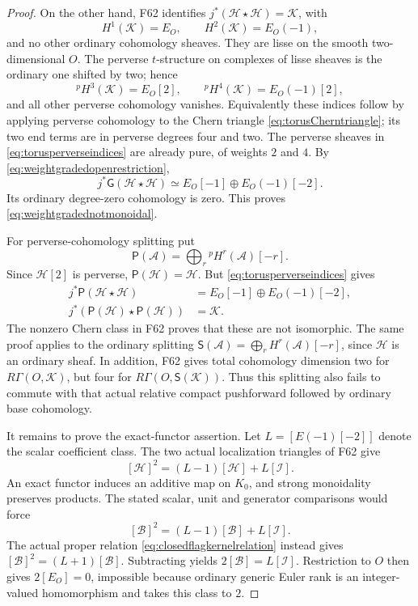 \documentclass[11pt,a4paper]{article}
\newcommand{\fid}[1]{\textsf{#1}}\newcommand{\gate}[1]{\textsf{#1}}
\theoremstyle{named}\newtheorem{finding}{Finding}[section]
\theoremstyle{definition}\newtheorem{definition}[finding]{Definition}
\theoremstyle{remark}\newtheorem{remark}[finding]{Remark}
\begin{document}
\begin{proof}
On the other hand, \fid{F62} identifies
\(j^*(\mathcal H\star\mathcal H)=\mathcal K\), with
\[
 H^1(\mathcal K)=E_O,\qquad
 H^2(\mathcal K)=E_O(-1),
\]
and no other ordinary cohomology sheaves. They are lisse on
the smooth two-dimensional \(O\). The perverse \(t\)-structure
on complexes of lisse sheaves is the ordinary one shifted by
two; hence
\begin{equation}\label{eq:torusperverseindices}
 {}^pH^3(\mathcal K)=E_O[2],\qquad
 {}^pH^4(\mathcal K)=E_O(-1)[2],
\end{equation}
and all other perverse cohomology vanishes. Equivalently these
indices follow by applying perverse cohomology to the Chern
triangle \eqref{eq:torusCherntriangle}; its two end terms
are in perverse degrees four and two. The perverse sheaves
in \eqref{eq:torusperverseindices} are already pure, of weights
\(2\) and \(4\). By
\eqref{eq:weightgradedopenrestriction},
\begin{equation}\label{eq:weightgradedproductrestriction}
 j^*\mathsf G(\mathcal H\star\mathcal H)
       \simeq E_O[-1]\oplus E_O(-1)[-2].
\end{equation}
Its ordinary degree-zero cohomology is zero. This proves
\eqref{eq:weightgradednotmonoidal}.

For perverse-cohomology splitting put
\[
       \mathsf P(\mathcal A)=
            \bigoplus_r{}^pH^r(\mathcal A)[-r].
\]
Since \(\mathcal H[2]\) is perverse,
\(\mathsf P(\mathcal H)=\mathcal H\). But
\eqref{eq:torusperverseindices} gives
\[
 \begin{split}
 j^*\mathsf P(\mathcal H\star\mathcal H)
   &=E_O[-1]\oplus E_O(-1)[-2],\\
 j^*(\mathsf P(\mathcal H)\star\mathsf P(\mathcal H))
   &=\mathcal K.
 \end{split}
\]
The nonzero Chern class in \fid{F62} proves that these are
not isomorphic. The same proof applies to the ordinary
splitting \(\mathsf S(\mathcal A)=\bigoplus_r
H^r(\mathcal A)[-r]\), since \(\mathcal H\) is an ordinary
sheaf. In addition, \fid{F62} gives total cohomology dimension
two for \(R\Gamma(O,\mathcal K)\), but four for
\(R\Gamma(O,\mathsf S(\mathcal K))\). Thus this splitting
also fails to commute with that actual relative compact
pushforward followed by ordinary base cohomology.

It remains to prove the exact-functor assertion.
Let \(L=[E(-1)[-2]]\) denote the scalar coefficient class.
The two actual localization triangles of \fid{F62} give
\begin{equation}\label{eq:openflagKzerorelation}
       [\mathcal H]^2=(L-1)[\mathcal H]+L[\mathcal I].
\end{equation}
An exact functor induces an additive map on \(K_0\), and
strong monoidality preserves products. The stated scalar,
unit and generator comparisons would force
\[
        [\mathcal B]^2=(L-1)[\mathcal B]+L[\mathcal I].
\]
The actual proper relation
\eqref{eq:closedflagkernelrelation} instead gives
\([\mathcal B]^2=(L+1)[\mathcal B]\). Subtracting yields
\(2[\mathcal B]=L[\mathcal I]\). Restriction to \(O\)
then gives \(2[E_O]=0\), impossible because ordinary
generic Euler rank is an integer-valued homomorphism and
takes this class to \(2\).
\end{proof}
\end{document}
